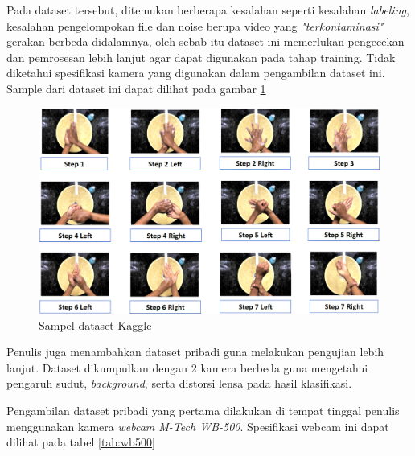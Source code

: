 Pada dataset tersebut, ditemukan berberapa kesalahan seperti kesalahan \textit{labeling}, kesalahan pengelompokan file dan noise berupa video yang \textit{"terkontaminasi"} gerakan berbeda didalamnya, oleh sebab itu dataset ini memerlukan pengecekan dan pemrosesan lebih lanjut agar dapat digunakan pada tahap training. Tidak diketahui spesifikasi kamera yang digunakan dalam pengambilan dataset ini. Sample dari dataset ini dapat dilihat pada gambar \ref{fig:sampledata}

\begin{figure}[!ht]
	\centering
	\includegraphics[width=0.9\columnwidth]{gambar/sampledatasetkaggle.png}
	\caption{Sampel dataset Kaggle\cite{cit:kaggledata}}
	\label{fig:sampledata}
\end{figure}

Penulis juga menambahkan dataset pribadi guna melakukan pengujian lebih lanjut. Dataset dikumpulkan dengan 2 kamera berbeda guna mengetahui pengaruh sudut, \textit{background}, serta distorsi lensa pada hasil klasifikasi.

Pengambilan dataset pribadi yang pertama dilakukan di tempat tinggal penulis menggunakan kamera \textit{webcam M-Tech WB-500}. Spesifikasi webcam ini dapat dilihat pada tabel \ref{tab:wb500}
\begin{table}[!ht]
	\centering
	\caption{Spesifikasi M-Tech WB-500 \cite{cit:wb500}}
	\label{tab:wb500}
\end{table}


